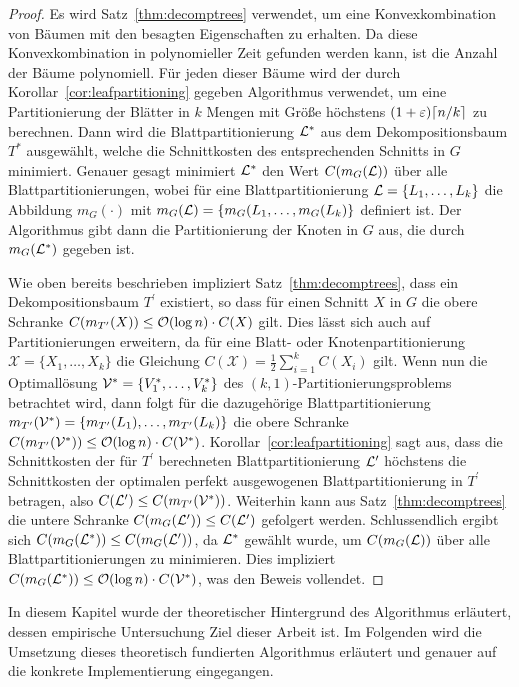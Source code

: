 \begin{proof}
    Es wird Satz~\ref{thm:decomptrees} verwendet, um eine Konvexkombination von Bäumen mit den besagten Eigenschaften zu erhalten.
    Da diese Konvexkombination in polynomieller Zeit gefunden werden kann, ist die Anzahl der Bäume polynomiell.
    Für jeden dieser Bäume wird der durch Korollar~\ref{cor:leafpartitioning} gegeben Algorithmus verwendet, um eine Partitionierung der Blätter in $k$ Mengen mit Größe höchstens $(1 + \eps) \ceil*{n/k}$ zu berechnen. Dann wird die Blattpartitionierung $\mathcal{L}^*$ aus dem Dekompositionsbaum $T^*$ ausgewählt, welche die Schnittkosten des entsprechenden Schnitts in $G$ minimiert.
    Genauer gesagt minimiert $\mathcal{L}^*$ den Wert $C(m_G(\mathcal{L}))$ über alle Blattpartitionierungen, wobei für eine Blattpartitionierung $\mathcal{L} = \{L_1, \ldots, L_k\}$ die Abbildung $m_G(\cdot)$ mit $m_G(\mathcal{L}) = \{m_G(L_1, \ldots, m_G(L_k)\}$ definiert ist.
    Der Algorithmus gibt dann die Partitionierung der Knoten in $G$ aus, die durch $m_G(\mathcal{L}^*)$ gegeben ist.

    Wie oben bereits beschrieben impliziert Satz~\ref{thm:decomptrees}, dass ein Dekompositionsbaum $T^\prime$ existiert, so dass für einen Schnitt $X$ in $G$ die obere Schranke $C(m_{T^\prime}(X)) \leq \mathcal{O}(\log n) \cdot C(X)$ gilt.
    Dies lässt sich auch auf Partitionierungen erweitern, da für eine Blatt- oder Knotenpartitionierung $\mathcal{X} = \{X_1, \ldots, X_k\}$ die Gleichung $C(\mathcal{X}) = \frac{1}{2} \sum_{i=1}^k C(X_i)$ gilt.
    Wenn nun die Optimallösung $\mathcal{V}^* = \{ V_1^*, \ldots, V_k^* \}$ des $(k, 1)$\hyp Partitionierungsproblems betrachtet wird, dann folgt für die dazugehörige Blattpartitionierung $m_{T^\prime}(\mathcal{V}^*) = \{ m_{T^\prime}(L_1), \ldots, m_{T^\prime}(L_k) \}$ die obere Schranke $C(m_{T^\prime}(\mathcal{V}^*)) \leq \mathcal{O}(\log n) \cdot C(\mathcal{V}^*)$.
    Korollar~\ref{cor:leafpartitioning} sagt aus, dass die Schnittkosten der für $T^\prime$ berechneten Blattpartitionierung $\mathcal{L}^\prime$ höchstens die Schnittkosten der optimalen perfekt ausgewogenen Blattpartitionierung in $T^\prime$ betragen, also $C(\mathcal{L}^\prime) \leq C(m_{T^\prime}(\mathcal{V}^*))$.
    Weiterhin kann aus Satz~\ref{thm:decomptrees} die untere Schranke $C(m_G(\mathcal{L}^\prime)) \leq C(\mathcal{L}^\prime)$ gefolgert werden.
    Schlussendlich ergibt sich $C(m_G(\mathcal{L}^*)) \leq C(m_G(\mathcal{L}^\prime))$, da $\mathcal{L}^*$ gewählt wurde, um $C(m_G(\mathcal{L}))$ über alle Blattpartitionierungen zu minimieren.
    Dies impliziert $C(m_G(\mathcal{L}^*)) \leq \mathcal{O}(\log n) \cdot C(\mathcal{V}^*)$, was den Beweis vollendet.
\end{proof}

In diesem Kapitel wurde der theoretischer Hintergrund des Algorithmus erläutert, dessen empirische Untersuchung Ziel dieser Arbeit ist.  
Im Folgenden wird die Umsetzung dieses theoretisch fundierten Algorithmus erläutert und genauer auf die konkrete Implementierung eingegangen.

